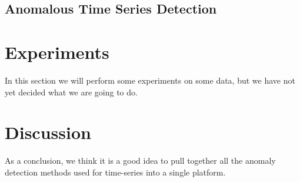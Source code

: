 \documentclass[a4paper, 10pt]{article}
\begin{document}
\subsection{Anomalous Time Series Detection}



\section{Experiments \label{experiments}}

In this section we will perform some experiments on some data, but we have not yet decided what we are going to do.

\section{Discussion \label{discussion}}

As a conclusion, we think it is a good idea to pull together all the anomaly detection methods used for time-series into a single platform.

 

\end{document}
